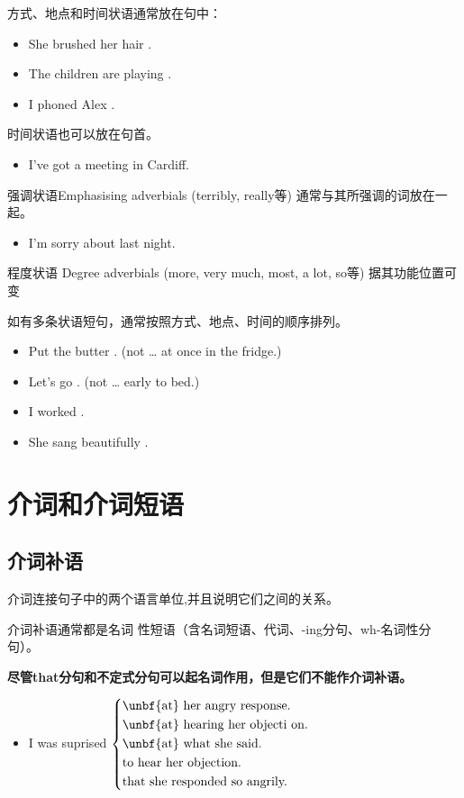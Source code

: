 方式、地点和时间状语通常放在句中：
\begin{itemize}
\item She brushed her hair .
\item The children are playing .
\item I phoned Alex .
\end{itemize}

时间状语也可以放在句首。
\begin{itemize}
\item {} I've got a meeting in Cardiff.
\end{itemize}

强调状语Emphasising adverbials (terribly, really等) 通常与其所强调的词放在一
起。
\begin{itemize}
\item I'm  sorry about last night.
\end{itemize}

程度状语 Degree adverbials (more, very much, most, a lot, so等) 据其功能位置可变

如有多条状语短句，通常按照方式、地点、时间的顺序排列。
\begin{itemize}
\item Put the butter  . (not … at once in the fridge.)
\item Let's go  . (not … early to bed.)
\item I worked  .
\item She sang beautifully  .
\end{itemize}


\section{介词和介词短语}

\subsection{介词补语}

介词连接句子中的两个语言单位,并且说明它们之间的关系。

介词补语通常都是名词
性短语（含名词短语、代词、-ing分句、wh-名词性分句）。

\textbf{尽管that分句和不定式分句可以起名词作用，但是它们不能作介词补语。}

\begin{itemize}
\item I was suprised $ \left\{
    \begin{aligned}
     &\text{\unbf{at} her angry response.}\\
     &\text{\unbf{at} hearing her objecti on.}\\
     &\text{\unbf{at} what she said.}\\
     &\text{to hear her objection.}\\
     &\text{that she responded so angrily. }
    \end{aligned}
  \right. $

\end{itemize}

